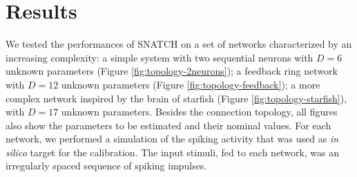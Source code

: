 \documentclass[utf8]{frontiersFPHY} %
\newcommand {\name}{SNATCH}
\begin{document}
\section{Results}
\label{sec:results}


We tested the performances of \name{} on a set of networks characterized by an increasing complexity: a simple system with two sequential neurons with $D=6$ unknown parameters (Figure \ref{fig:topology-2neurons}); a feedback ring network with $D=12$ unknown parameters (Figure \ref{fig:topology-feedback}); a more complex network inspired by the brain of starfish (Figure \ref{fig:topology-starfish}), with $D=17$ unknown parameters.
Besides the connection topology, all figures also show the parameters to be estimated and their nominal values.
For each network, we performed a simulation of the spiking activity that was used as \emph{in silico} target for the calibration.
The input stimuli, fed to each network, was an irregularly spaced sequence of spiking impulses.
\end{document}
